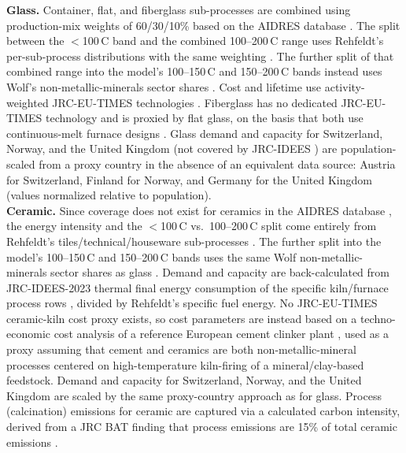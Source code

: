 \begin{figure}[h!]
    \centering
    
    \label{fig:SIFig4}
\end{figure}

\textbf{Glass.} Container, flat, and fiberglass sub-processes are combined using production-mix weights of 60/30/10\% based on the AIDRES database \cite{AIDRES2023}. The split between the $<$100\,\degree C band and the combined 100--200\,\degree C range uses Rehfeldt's per-sub-process distributions with the same weighting \cite{Rehfeldt2017}. The further split of that combined range into the model's 100--150\,\degree C and 150--200\,\degree C bands instead uses Wolf's non-metallic-minerals sector shares \cite{Wolf2017}. Cost and lifetime use activity-weighted JRC-EU-TIMES technologies \cite{JRCEUTIMES2013}. Fiberglass has no dedicated JRC-EU-TIMES technology and is proxied by flat glass, on the basis that both use continuous-melt furnace designs \cite{JRC_BAT_Glass2013}. Glass demand and capacity for Switzerland, Norway, and the United Kingdom (not covered by JRC-IDEES \cite{JRC2023}) are population-scaled from a proxy country in the absence of an equivalent data source: Austria for Switzerland, Finland for Norway, and Germany for the United Kingdom (values normalized relative to population). \\

\textbf{Ceramic.} Since coverage does not exist for ceramics in the AIDRES database \cite{AIDRES2023}, the energy intensity and the $<$100\,\degree C vs.\ 100--200\,\degree C split come entirely from Rehfeldt's tiles/technical/houseware sub-processes \cite{Rehfeldt2017}. The further split into the model's 100--150\,\degree C and 150--200\,\degree C bands uses the same Wolf non-metallic-minerals sector shares as glass \cite{Wolf2017}. Demand and capacity are back-calculated from JRC-IDEES-2023 thermal final energy consumption of the specific kiln/furnace process rows \cite{JRC2023}, divided by Rehfeldt's specific fuel energy.  No JRC-EU-TIMES ceramic-kiln cost proxy exists, so cost parameters are instead based on a techno-economic cost analysis of a reference European cement clinker plant \cite{Gardarsdottir2019}, used as a proxy assuming that cement and ceramics are both non-metallic-mineral processes centered on high-temperature kiln-firing of a mineral/clay-based feedstock. Demand and capacity for Switzerland, Norway, and the United Kingdom are scaled by the same proxy-country approach as for glass. Process (calcination)  emissions for ceramic are captured via a calculated carbon intensity, derived from a JRC BAT finding that process emissions are 15\% of total ceramic emissions \cite{JRC_BAT_Ceramics2026}.\\

